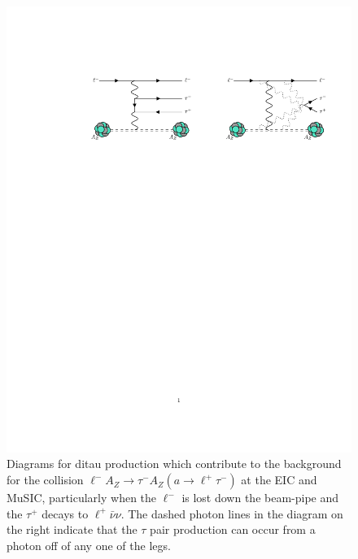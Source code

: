 \begin{figure}[t!]
    \centering
    \includegraphics[width=\linewidth]{figures/chapter5/ditau.pdf}
    \caption[Ditau production process at lepton-ion collider experiments.]{Diagrams for ditau production which contribute to the background for the collision $\ell^- A_Z \rightarrow \tau^- A_Z (a \rightarrow \ell^+\tau^-)$ at the EIC and MuSIC, particularly when the $\ell^-$ is lost down the beam-pipe and the $\tau^+$ decays to $\ell^+\bar{\nu}\nu$. The dashed photon lines in the diagram on the right indicate that the $\tau$ pair production can occur from a photon off of any one of the legs. }
    \label{fig:ditau_background}
\end{figure}

